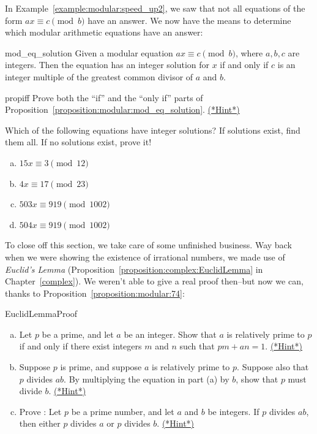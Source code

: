 In Example~\ref{example:modular:speed_up2}, we saw that not all equations of the form $ax \equiv c \pmod b$ have an answer.  We  now have the means to determine which modular arithmetic equations have an answer:

\begin{prop}{mod_eq_solution} 
Given a modular equation $ax \equiv c\pmod{b}$, where $a,b,c$ are  integers. Then the equation has an integer solution for $x$ if and only if $c$ is an integer multiple of the greatest common divisor of $a$ and $b$.  
\end{prop}

\begin {exercise}{propiff}
Prove both the ``if''  and the ``only if'' parts of Proposition~\ref{proposition:modular:mod_eq_solution}.
\hyperref[sec:modular_arithmetic:hints]{(*Hint*)}
\end{exercise}


\begin{exercise}{}
Which of the following equations have integer solutions? If solutions exist, find them all. If no solutions exist, prove it!
\begin{enumerate}[(a)]
\item
$15x \equiv 3 \pmod{12}$
\item
$4x \equiv 17 \pmod{23}$
\item
$503x \equiv 919 \pmod{1002}$
\item
$504x \equiv 919 \pmod{1002}$
\end{enumerate}

\end{exercise}

To close off this section, we take care of some unfinished business. Way back when we were showing the existence of irrational numbers, we made use of \emph{Euclid's Lemma} (Proposition~\ref{proposition:complex:EuclidLemma} in Chapter~\ref{complex}). We weren't able to give a real proof then--but now we can, thanks to Proposition~\ref{proposition:modular:74}:

\begin{exercise}{EuclidLemmaProof}
\begin{enumerate}[(a)]
\item
Let  $p$ be a prime, and let  $a$ be an integer.  Show that $a$ is relatively prime to $p$  if and only if there exist integers $m$ and $n$ such that $pm + an=1$.
\hyperref[sec:modular_arithmetic:hints]{(*Hint*)}
\item
Suppose $p$ is prime, and suppose $a$ is relatively prime to $p$.  Suppose also that $p$ divides $ab$. By multiplying the equation in part (a) by $b$, show that $p$ must divide $b$.
\hyperref[sec:modular_arithmetic:hints]{(*Hint*)}
\item
Prove :  Let $p$ be a prime number, and let $a$ and $b$ be integers. If $p$ divides $ab$, then either $p$ divides $a$ or $p$ divides $b$.
\hyperref[sec:modular_arithmetic:hints]{(*Hint*)}
\end{enumerate}
\end{exercise}


